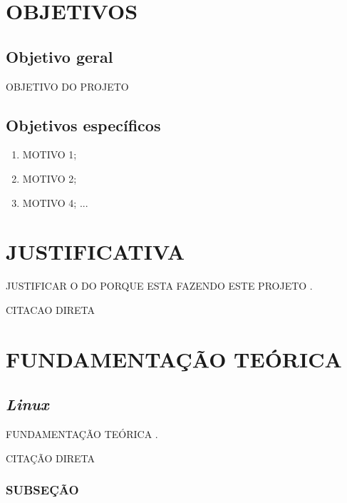 \documentclass{pre-project}
\begin{document}
\chapter{OBJETIVOS}
	\section{Objetivo geral}
	OBJETIVO DO PROJETO
	
	\section{Objetivos específicos}
		\begin{enumerate}
			\item MOTIVO 1;
			\item MOTIVO 2;
			\item MOTIVO 4; ...
			\end{enumerate}

\chapter{JUSTIFICATIVA}
JUSTIFICAR O DO PORQUE ESTA FAZENDO ESTE PROJETO \cite{mota2012descobrindo}.

		\begin{citacao}
			CITACAO DIRETA
		\end{citacao}


\chapter{FUNDAMENTAÇÃO TEÓRICA}
	\section{\textit{Linux}}
	
	FUNDAMENTAÇÃO TEÓRICA \cite{nomenacitacao}.
	
	
	
		\begin{citacao}
		CITAÇÃO DIRETA
		\end{citacao}
	
	
		\subsection{SUBSEÇÃO}
		
	
\end{document}
